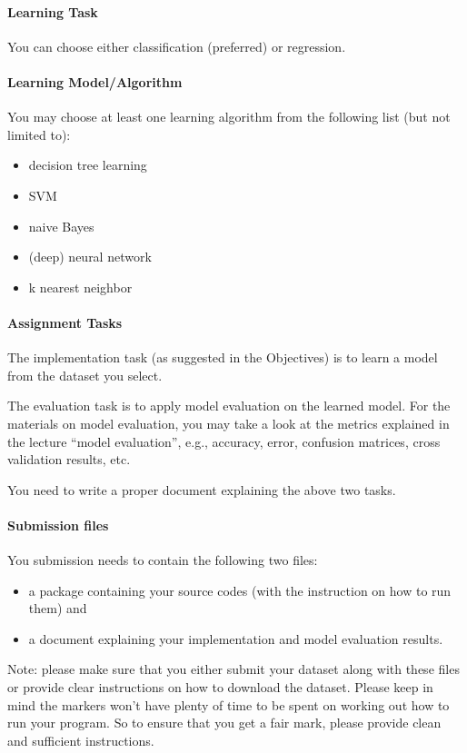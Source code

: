 \documentclass[12pt,a4]{article}
\begin{document}
\paragraph{Learning Task}  You can choose either classification (preferred) or regression. 

\paragraph{Learning Model/Algorithm} You may choose at least one learning algorithm from the following list (but not limited to): 
\begin{itemize}
\item decision tree learning
\item SVM
\item naive Bayes
\item (deep) neural network
\item k nearest neighbor
\end{itemize} 


\paragraph{Assignment Tasks} 

The implementation task (as suggested in the Objectives) is to learn a model from the dataset you select. 

The evaluation task is to apply model evaluation on the learned model. For the materials on model evaluation, you may take a look at the metrics explained in the lecture ``model evaluation'', e.g., accuracy, error, confusion matrices, cross validation results, etc.  

You need to write a proper document explaining the above two tasks. 

\paragraph{Submission files} You submission needs to contain the following two files: 
\begin{itemize}

\item a package containing your source codes (with the instruction on how to run them) and 
\item a document explaining your implementation and model evaluation results. 

\end{itemize}

Note: please make sure that you either submit your dataset along with these files or provide clear instructions on how to download the dataset. Please keep in mind the markers won't have plenty of time to be spent on working out how to run your program. So to ensure that you get a fair mark, please provide clean and sufficient instructions.
\end{document}
